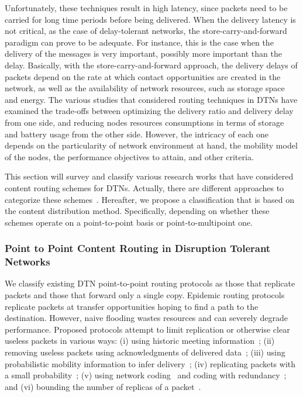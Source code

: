 Unfortunately, these techniques result in high latency, since packets need to be carried for long time periods before being delivered. When the delivery latency is not critical, as
the case of delay-tolerant networks, the store-carry-and-forward paradigm can prove to be adequate. For instance, this is the case when the delivery of the messages is very important, possibly more important than the delay. Basically, with the store-carry-and-forward approach, the delivery delays of packets depend on the rate at which contact opportunities are created in the network, as well as the availability of network resources, such as storage space and energy. The various studies that considered routing techniques in DTNs have examined the trade-offs between optimizing the delivery ratio and delivery delay from one side, and reducing nodes resources consumptions in terms of storage and battery usage from the other side. However, the intricacy of each one depends on the particularity of network environment at hand, the mobility model of the nodes, the performance objectives to attain, and other criteria.

This section will survey and classify various research works that have considered content routing schemes for DTNs. Actually, there are different approaches to categorize these schemes~\cite{Ward:RoutingSurvey, DTNRoutingSurvey06}. Hereafter, we propose a classification that is based on the content distribution method. Specifically, depending on whether these schemes operate on a point-to-point basis or point-to-multipoint one.

\subsubsection{Point to Point Content Routing in Disruption Tolerant Networks}

We classify existing DTN point-to-point routing protocols as those that replicate packets and those that forward only a single copy. Epidemic routing protocols replicate packets at transfer opportunities hoping to find a path to the destination.
However, naive flooding wastes resources and can severely degrade performance. Proposed protocols attempt to limit replication or otherwise clear useless packets in various ways: (i) using historic meeting information~\cite{Wearable, MVRouting, Levine:MaxProp}; (ii) removing useless packets using acknowledgments of delivered data~\cite{Levine:MaxProp}; (iii) using probabilistic mobility information to infer delivery~\cite{Haas:wdtn}; (iv) replicating packets with a small probability~\cite{Tseng:broadcast}; (v) using network coding~\cite{LeBoudec:wdtn} and coding with
redundancy~\cite{Fall:Sigcomm05}; and (vi) bounding the number of replicas of a packet~\cite{Haas:wdtn,akis:wdtn,Vahdat:epidemic}.

